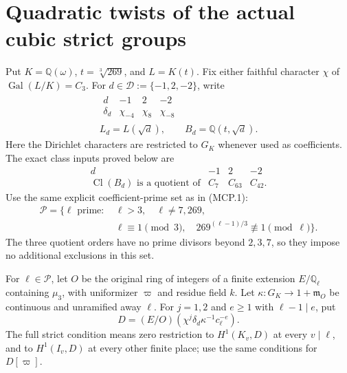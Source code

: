 \section{Quadratic twists of the actual cubic strict groups}
\label{sec:mixed-cubic-quadratic-twist-strict}

Put $K=\mathbb Q(\omega)$, $t=\sqrt[3]{269}$, and $L=K(t)$.
Fix either faithful character $\chi$ of
$\operatorname{Gal}(L/K)=C_3$.  For
$d\in\mathcal D:=\{-1,2,-2\}$, write
\[
 \begin{gathered}
 \begin{array}{c|ccc}
 d&-1&2&-2\\\hline
 \delta_d&\chi_{-4}&\chi_8&\chi_{-8}
 \end{array}\\
 L_d=L(\sqrt d),\qquad B_d=\mathbb Q(t,\sqrt d).
 \end{gathered}
 \tag{MCQ.1}
\]
Here the Dirichlet characters are restricted to $G_K$ whenever
used as coefficients.  The exact class inputs proved below are
\[
 \begin{array}{c|ccc}
 d&-1&2&-2\\\hline
 \operatorname{Cl}(B_d)\text{ is a quotient of}&C_7&C_{63}&C_{42}.
 \end{array}
 \tag{MCQ.2}
\]
Use the same explicit coefficient-prime set as in (MCP.1):
\[
 \begin{split}
 \mathscr P=\{\ell\text{ prime}:\ &\ell>3,\quad \ell\ne7,269,\\
 &\ell\equiv1\pmod3,\quad
 269^{(\ell-1)/3}\not\equiv1\pmod\ell\}.
 \end{split}
 \tag{MCQ.3}
\]
The three quotient orders have no prime divisors beyond $2,3,7$,
so they impose no additional exclusions in this set.

For $\ell\in\mathscr P$, let $O$ be the original ring of
integers of a finite extension $E/\mathbb Q_\ell$ containing
$\mu_3$, with uniformizer $\varpi$ and residue field $k$.
Let $\kappa:G_K\to1+\mathfrak m_O$ be continuous and unramified
away $\ell$.  For $j=1,2$ and $e\geq1$ with $\ell-1\mid e$,
put
\[
 D=(E/O)(\chi^j\delta_d\kappa^{-1}c_\ell^{-e}).
 \tag{MCQ.4}
\]
The full strict condition means zero restriction to
$H^1(K_v,D)$ at every $v\mid\ell$, and to $H^1(I_v,D)$
at every other finite place; use the same conditions for
$D[\varpi]$.

